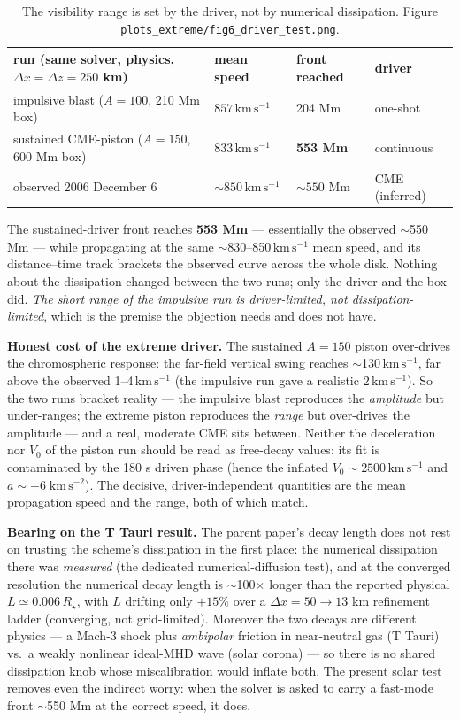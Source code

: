 \documentclass[11pt,a4paper]{article}
\newcommand{\kms}{\,\mathrm{km\,s^{-1}}}
\begin{document}
\begin{table}[h]\centering
\begin{tabular}{llll}
\toprule
run (same solver, physics, $\Delta x=\Delta z=250$ km) & mean speed & front reached & driver\\
\midrule
impulsive blast ($A{=}100$, 210 Mm box) & $857\kms$ & 204 Mm & one-shot\\
sustained CME-piston ($A{=}150$, 600 Mm box) & $833\kms$ & \textbf{553 Mm} & continuous\\
observed 2006 December 6 \cite{Bala2010} & $\sim850\kms$ & $\sim550$ Mm & CME (inferred)\\
\bottomrule
\end{tabular}
\caption{The visibility range is set by the driver, not by numerical dissipation.
Figure \texttt{plots\_extreme/fig6\_driver\_test.png}.}
\end{table}

\noindent The sustained-driver front reaches \textbf{553 Mm} --- essentially the observed
$\sim$550 Mm --- while propagating at the same $\sim$830--850$\kms$ mean speed, and its
distance--time track brackets the observed curve across the whole disk. Nothing about the
dissipation changed between the two runs; only the driver and the box did. \emph{The short
range of the impulsive run is driver-limited, not dissipation-limited}, which is the
premise the objection needs and does not have.

\medskip\noindent\textbf{Honest cost of the extreme driver.} The sustained $A=150$ piston
over-drives the chromospheric response: the far-field vertical swing reaches
$\sim$130$\kms$, far above the observed 1--4$\kms$ (the impulsive run gave a realistic
$2\kms$). So the two runs bracket reality --- the impulsive blast reproduces the
\emph{amplitude} but under-ranges; the extreme piston reproduces the \emph{range} but
over-drives the amplitude --- and a real, moderate CME sits between. Neither the
deceleration nor $V_0$ of the piston run should be read as free-decay values: its fit is
contaminated by the 180 s driven phase (hence the inflated $V_0\sim2500\kms$ and
$a\sim-6\;\mathrm{km\,s^{-2}}$). The decisive, driver-independent quantities are the mean
propagation speed and the range, both of which match.

\medskip\noindent\textbf{Bearing on the T Tauri result.} The parent paper's decay length
does not rest on trusting the scheme's dissipation in the first place: the numerical
dissipation there was \emph{measured} (the dedicated numerical-diffusion test), and at the
converged resolution the numerical decay length is $\sim$100$\times$ longer than the
reported physical $L\simeq0.006\,R_\star$, with $L$ drifting only $+15\%$ over a
$\Delta x=50\!\to\!13$ km refinement ladder (converging, not grid-limited). Moreover the
two decays are different physics --- a Mach-$3$ shock plus \emph{ambipolar} friction in
near-neutral gas (T Tauri) vs.\ a weakly nonlinear ideal-MHD wave (solar corona) --- so
there is no shared dissipation knob whose miscalibration would inflate both. The present
solar test removes even the indirect worry: when the solver is asked to carry a fast-mode
front $\sim$550 Mm at the correct speed, it does.
\end{document}

